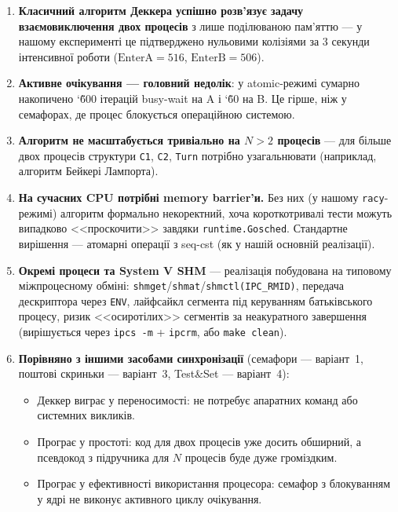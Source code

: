 \documentclass[a4paper,12pt]{article}
\begin{document}
\begin{enumerate}
    \item \textbf{Класичний алгоритм Деккера успішно розв'язує задачу
    взаємовиключення двох процесів} з лише поділюваною пам'яттю --- у
    нашому експерименті це підтверджено нульовими колізіями за 3
    секунди інтенсивної роботи ($\text{EnterA} = 516$, $\text{EnterB} =
    506$).

    \item \textbf{Активне очікування --- головний недолік}: у
    atomic-режимі сумарно накопичено \char`\~600 ітерацій busy-wait на
    A і \char`\~60 на B. Це гірше, ніж у семафорах, де процес
    блокується операційною системою.

    \item \textbf{Алгоритм не масштабується тривіально на $N>2$
    процесів} --- для більше двох процесів структури \texttt{C1},
    \texttt{C2}, \texttt{Turn} потрібно узагальнювати (наприклад,
    алгоритм Бейкері Лампорта).

    \item \textbf{На сучасних CPU потрібні memory barrier'и.} Без них
    (у нашому \texttt{racy}-режимі) алгоритм формально некоректний,
    хоча короткотривалі тести можуть випадково <<проскочити>> завдяки
    \texttt{runtime.Gosched}. Стандартне вирішення --- атомарні
    операції з seq-cst (як у нашій основній реалізації).

    \item \textbf{Окремі процеси та System V SHM} --- реалізація побудована на
    типовому міжпроцесному обміні: \texttt{shmget}/\texttt{shmat}/\texttt{shmctl(IPC\_RMID)},
    передача дескриптора через \texttt{ENV}, лайфсайкл сегмента під
    керуванням батьківського процесу, ризик <<осиротілих>> сегментів
    за неакуратного завершення (вирішується через \texttt{ipcs -m} +
    \texttt{ipcrm}, або \texttt{make clean}).

    \item \textbf{Порівняно з іншими засобами синхронізації} (семафори
    --- варіант~1, поштові скриньки --- варіант~3, Test\&Set ---
    варіант~4):
    \begin{itemize}
        \item Деккер виграє у переносимості: не потребує апаратних
        команд або системних викликів.
        \item Програє у простоті: код для двох процесів уже досить
        обширний, а псевдокод з підручника для $N$ процесів буде дуже
        громіздким.
        \item Програє у ефективності використання процесора: семафор з
        блокуванням у ядрі не виконує активного циклу очікування.
    \end{itemize}
\end{enumerate}
\end{document}
